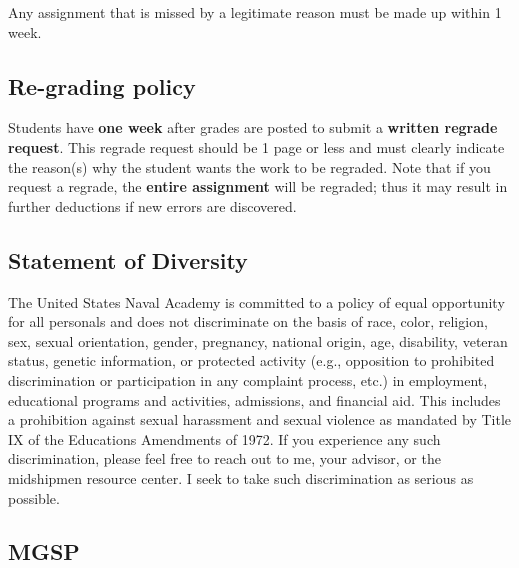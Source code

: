 \documentclass[letterpaper,hidelinks,oneside,11pt]{article}%
\begin{document}
Any assignment that is missed by a legitimate reason must be made up within 1 week.

\subsection*{Re-grading policy}
Students have \textbf{one week} after grades are posted to submit a \textbf{written regrade request}. This regrade request should be 1 page or less and must clearly indicate the reason(s) why the student wants the work to be regraded. Note that if you request a regrade, the \textbf{entire assignment} will be regraded; thus it may result in further deductions if new errors are discovered.
 



\subsection*{Statement of Diversity}

The United States Naval Academy is committed to a policy of equal opportunity for all personals and does not discriminate on the basis of race, color, religion, sex, sexual orientation, gender, pregnancy, national origin, age, disability, veteran status, genetic information, or protected activity (e.g., opposition to prohibited discrimination or participation in any complaint process, etc.) in employment, educational programs and activities, admissions, and financial aid. This includes a prohibition against sexual harassment and sexual violence as mandated by Title IX of the Educations Amendments of 1972. If you experience any such discrimination, please feel free to reach out to me, your advisor, or the midshipmen resource center. I seek to take such discrimination as serious as possible.

\subsection*{MGSP}
\end{document}
